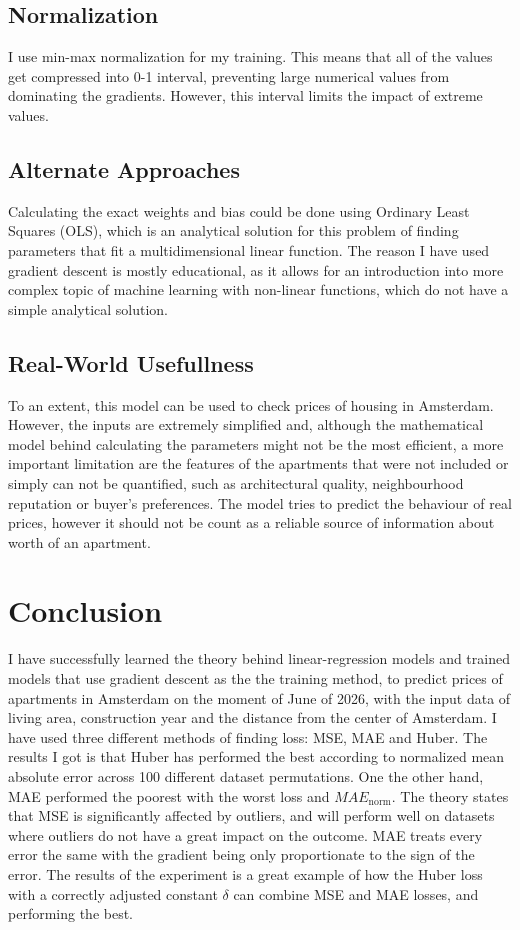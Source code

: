 \documentclass{article}
\begin{document}
\subsection{Normalization}

I use min-max normalization for my training. This means that all of the values get
compressed into 0-1 interval, preventing large numerical values from dominating the
gradients. However, this interval limits the impact of extreme values.


\subsection{Alternate Approaches}

Calculating the exact weights and bias could be done using Ordinary Least Squares (OLS),
which is an analytical solution for this problem of finding parameters that fit
a multidimensional linear function. The reason I have used gradient descent is
mostly educational, as it allows for an introduction into more complex topic of
machine learning with non-linear functions, which do not have a simple analytical
solution.


\subsection{Real-World Usefullness}

To an extent, this model can be used to check prices of housing in Amsterdam.
However, the inputs are extremely simplified and, although the mathematical model
behind calculating the parameters might not be the most efficient, a more
important limitation are the features of the apartments that were not included or
simply can not be quantified, such as architectural quality, neighbourhood reputation
or buyer's preferences. The model tries to predict the behaviour of real prices,
however it should not be count as a reliable source of information about
worth of an apartment.


\section{Conclusion}

I have successfully learned the theory behind linear-regression models and trained
models that use gradient descent as the the training method, to predict prices of
apartments in Amsterdam on the moment of June of 2026, with the input data of
living area, construction year and the distance from the center of Amsterdam.
I have used three different methods of finding loss: MSE, MAE and Huber. The results
I got is that Huber has performed the best according to normalized mean absolute
error across 100 different dataset permutations. One the other hand, MAE performed
the poorest with the worst loss and $MAE_{\mathrm{norm}}$.
The theory states that MSE is significantly affected by outliers, and will perform
well on datasets where outliers do not have a great impact on the outcome.
MAE treats every error the same with the gradient being only proportionate to the
sign of the error. The results of the experiment is a great example of how the Huber
loss with a correctly adjusted constant $\delta$ can combine MSE and MAE losses,
and performing the best.
\end{document}
